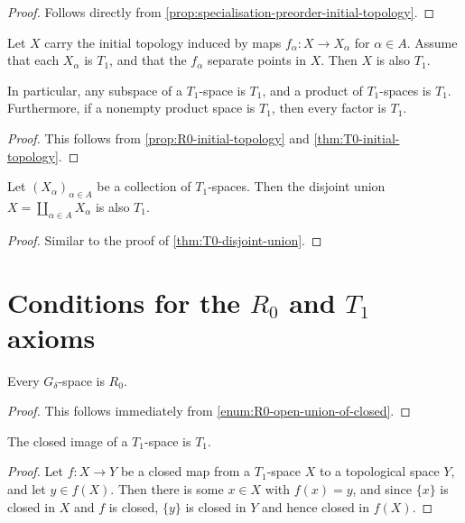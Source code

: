 \documentclass[article, a4paper, 11pt, oneside]{memoir}
\numberwithin{equation}{chapter}
\begin{document}
\begin{proof}
    Follows directly from \cref{prop:specialisation-preorder-initial-topology}.
\end{proof}


\begin{proposition}
    \label{thm:T1-initial-topology}
    Let $X$ carry the initial topology induced by maps $f_\alpha \colon X \to X_\alpha$ for $\alpha \in A$. Assume that each $X_\alpha$ is $T_1$, and that the $f_\alpha$ separate points in $X$. Then $X$ is also $T_1$.

    In particular, any subspace of a $T_1$-space is $T_1$, and a product of $T_1$-spaces is $T_1$. Furthermore, if a nonempty product space is $T_1$, then every factor is $T_1$.
\end{proposition}

\begin{proof}
    This follows from \cref{prop:R0-initial-topology} and \cref{thm:T0-initial-topology}.
\end{proof}


\begin{proposition}
    Let $(X_\alpha)_{\alpha \in A}$ be a collection of $T_1$-spaces. Then the disjoint union $X = \coprod_{\alpha \in A} X_\alpha$ is also $T_1$.
\end{proposition}

\begin{proof}
    Similar to the proof of \cref{thm:T0-disjoint-union}.
\end{proof}


\section[Conditions for the R0 and T1 axioms]{Conditions for the $R_0$ and $T_1$ axioms}

\begin{proposition}
    Every $G_\delta$-space is $R_0$.
\end{proposition}

\begin{proof}
    This follows immediately from \cref{enum:R0-open-union-of-closed}.
\end{proof}


\begin{proposition}
    The closed image\footnotemark{} of a $T_1$-space is $T_1$.
\end{proposition}

\begin{proof}%
    Let $f \colon X \to Y$ be a closed map from a $T_1$-space $X$ to a topological space $Y$, and let $y \in f(X)$. Then there is some $x \in X$ with $f(x) = y$, and since $\{x\}$ is closed in $X$ and $f$ is closed, $\{y\}$ is closed in $Y$ and hence closed in $f(X)$.
\end{proof}
\end{document}
